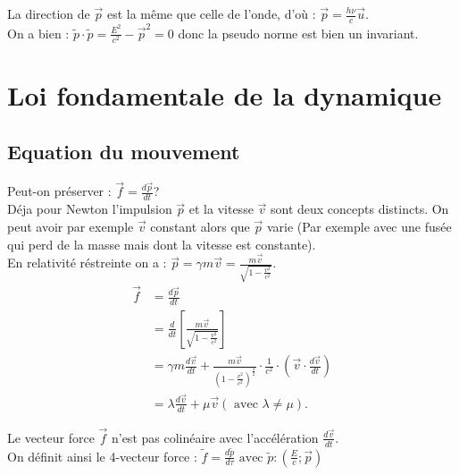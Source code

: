 \documentclass{article}
\begin{document}
La direction de \(\vec{p}\) est la même que celle de l'onde, d'où : \(\vec{p} = \frac{h\nu}{c}\vec{u}\).\\
On a bien : \(\tilde{p}\cdot \tilde{p} = \frac{E^2}{c^2}-\vec{p}^2 = 0\) donc la pseudo norme est bien un invariant.

\section{Loi fondamentale de la dynamique}
\subsection{Equation du mouvement}
Peut-on préserver : \(\vec{f} = \frac{d\vec{p}}{dt}\)?\\
Déja pour Newton l'impulsion \(\vec{p}\) et la vitesse \(\vec{v}\) sont deux concepts distincts. On peut avoir par exemple \(\vec{v}\) constant alors que \(\vec{p}\) varie (Par exemple avec une fusée qui perd de la masse mais dont la vitesse est constante).\\
En relativité réstreinte on a : \(\vec{p} = \gamma m\vec{v} = \frac{m\vec{v}}{\sqrt{1-\frac{v^2}{c^2}}}\).\\
\begin{align*}
    \vec{f} &= \frac{d\vec{p}}{dt} \\
    &= \frac{d}{dt} \left[\frac{m\vec{v}}{\sqrt{1-\frac{v^2}{c^2}} }\right] \\
    &= \gamma m \frac{d\vec{v}}{dt} + \frac{m\vec{v}}{(1-\frac{v^2}{c^2})^{\frac{3}{2}}} \cdot \frac{1}{c^2} \cdot (\vec{v}\cdot \frac{d\vec{v}}{dt}) \\
    &= \lambda \frac{d\vec{v}}{dt} + \mu \vec{v} (\text{ avec } \lambda \neq \mu )
.\end{align*}

Le vecteur force \(\vec{f}\) n'est pas colinéaire avec l'accélération \(\frac{d\vec{v}}{dt}\).\\
On définit ainsi le 4-vecteur force : \(\tilde{f} = \frac{d\tilde{p}}{d\tau} \text{ avec } \tilde{p} : (\frac{E}{c};\vec{p})\)\\
\end{document}
